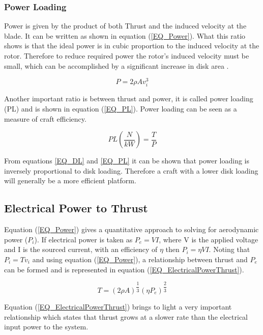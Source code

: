 		
		
		\subsubsection{Power Loading}
		Power is given by the product of both Thrust and the induced velocity at the blade. It can be written as shown in equation (\ref{EQ_Power}). What this ratio shows is that the ideal power is in cubic proportion to the induced velocity at the rotor. Therefore to reduce required power the rotor's induced velocity must be small, which can be accomplished by a significant increase in disk area \cite{Leishman}.
		
		\begin{equation}
		\label{EQ_Power}
		P = 2 \rho A v_{i}^3
		\end{equation}
		
		Another important ratio is between thrust and power, it is called power loading (PL) and is shown in equation (\ref{EQ_PL}). Power loading can be seen as a measure of craft efficiency. 
		
		\begin{equation}
		\label{EQ_PL}
		PL (\frac{N}{kW})= \frac{T}{P}
		\end{equation}
		
		From equations \eqref{EQ_DL} and \eqref{EQ_PL} it can be shown that power loading is inversely proportional to disk loading. Therefore a craft with a lower disk loading will generally be a more efficient platform.

	\subsection{Electrical Power to Thrust}
	Equation (\ref{EQ_Power}) gives a quantitative approach to solving for aerodynamic power ($P_i$). If electrical power is taken as $P_e = VI$, where V is the applied voltage and I is the sourced current, with an efficiency of $\eta$ then $P_i = \eta VI$. Noting that $P_i = T v_i$ and using equation (\ref{EQ_Power}), a relationship between thrust and $P_e$ can be formed and is represented in equation (\ref{EQ_ElectricalPowerThrust}).
	
	\begin{equation}
	\label{EQ_ElectricalPowerThrust}
	T = (2\rho A)^{\dfrac{1}{3}} (\eta P_e)^{\dfrac{2}{3}}
	\end{equation}
	
	Equation (\ref{EQ_ElectricalPowerThrust}) brings to light a very important relationship which states that thrust grows at a slower rate than the electrical input power to the system.
	
